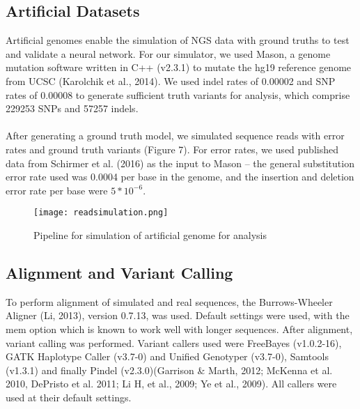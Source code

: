 \documentclass{article}
\begin{document}
\subsection{Artificial Datasets}
Artificial genomes enable the simulation of NGS data with ground truths to test and validate a neural network. For our simulator, we used Mason, a genome mutation software written in C++ (v2.3.1) to mutate the hg19 reference genome from UCSC (Karolchik et al., 2014). We used indel rates of 0.00002 and SNP rates of 0.00008 to generate sufficient truth variants for analysis, which comprise 229253 SNPs and 57257 indels.\\\\
After generating a ground truth model, we simulated sequence reads with error rates and ground truth variants (Figure 7). For error rates, we used published data from Schirmer et al. (2016) as the input to Mason -- the general substitution error rate used was 0.0004 per base in the genome, and the insertion and deletion error rate per base were $5*10^{-6}$.

\begin{figure}[H]
\texttt{[image: readsimulation.png]}
\caption{Pipeline for simulation of artificial genome for analysis}
\centering
\end{figure}

\subsection{Alignment and Variant Calling} 
To perform alignment of simulated and real sequences, the Burrows-Wheeler Aligner (Li, 2013), version 0.7.13, was used. Default settings were used, with the mem option which is known to work well with longer sequences. After alignment, variant calling was performed. Variant callers used were FreeBayes (v1.0.2-16), GATK Haplotype Caller (v3.7-0) and Unified Genotyper (v3.7-0), Samtools (v1.3.1) and finally Pindel (v2.3.0)(Garrison \& Marth, 2012; McKenna et al. 2010, DePristo et al. 2011; Li H, et al., 2009; Ye et al., 2009). All callers were used at their default settings.
\end{document}
